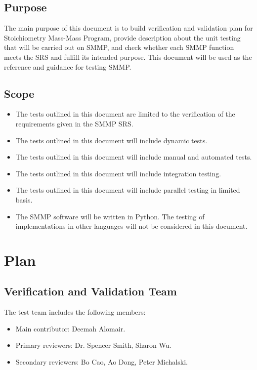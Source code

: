 \documentclass[12pt, titlepage]{article}
\begin{document}
\subsection{Purpose}

The main purpose of this document is to build verification and validation plan for Stoichiometry Mass-Mass Program, provide  description about the unit testing that will be carried out on SMMP, and check whether each SMMP function meets the SRS and fulfill its intended purpose. This document will be used as the reference and guidance for testing SMMP.


\subsection{Scope}
\begin{itemize}
\item The tests outlined in this document are limited to the verification of the requirements given in the SMMP SRS. 
\item The tests outlined in this document will include dynamic tests.
\item The tests outlined in this document will include manual and automated tests.
\item The tests outlined in this document will include integration testing.
\item The tests outlined in this document will include parallel testing in limited basis.
\item The SMMP software will be written in Python. The testing of implementations in other languages will not be considered in this document.

\end{itemize}

\section{Plan}
	
\subsection{Verification and Validation Team}

The test team includes the following members:
\begin{itemize}
\item Main contributor: Deemah Alomair.
\item Primary reviewers: Dr. Spencer Smith, Sharon Wu.
\item Secondary reviewers: Bo Cao, Ao Dong, Peter Michalski.
\end{itemize}
\end{document}
